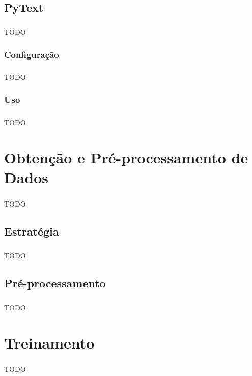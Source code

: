 \documentclass[grad,numbers]{coppe}
\begin{document}
  \section{PyText}
  	\paragraph{}TODO
  	\subsection{Configuração}
  		\paragraph{}TODO
  	\subsection{Uso}
  		\paragraph{}TODO
  
  \chapter{Obtenção e Pré-processamento de Dados}
  	\paragraph{}TODO
  	\section{Estratégia}
  		\paragraph{}TODO
  	\section{Pré-processamento}
  		\paragraph{}TODO
  
  \chapter{Treinamento}
	  \paragraph{}TODO
\end{document}
